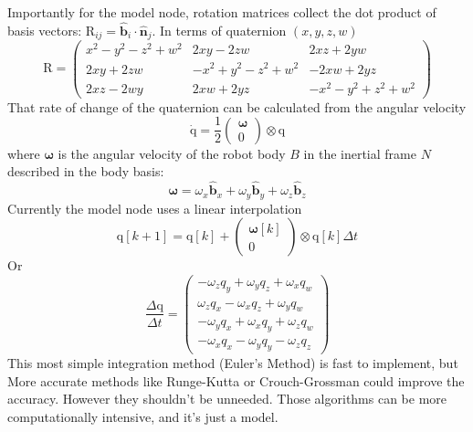 \documentclass[lettersize,journal]{IEEEtran}
\begin{document}
Importantly for the model node, rotation matrices collect the dot product of basis vectors: $\mathrm{R}_{ij} = \mathbf{\hat{b}}_i \cdot \mathbf{\hat{n}}_j$. In terms of quaternion $(x, y, z, w)$
\begin{equation}
	\mathrm{R}=\left(
	\begin{smallmatrix}
		x^2-y^2-z^2+w^2 & 2xy-2zw & 2xz+2yw \\
    2xy+2zw & -x^2+y^2-z^2+w^2 & -2xw+2yz \\
    2xz-2wy & 2xw+2yz & -x^2-y^2+z^2+w^2
	\end{smallmatrix} 
	\right) \label{EQN:RotationMatrix}
\end{equation}
That rate of change of the quaternion can be calculated from the angular velocity
\begin{equation}
	\mathrm{\dot{q}} = \frac{1}{2}
	\begin{pmatrix}
	  \boldsymbol\omega \\
		0
	\end{pmatrix}
	\otimes \mathrm{q}
\end{equation}
where $\boldsymbol\omega$ is the angular velocity of the robot body $B$ in the inertial frame $N$ described in the body basis:
\begin{equation}
	\boldsymbol\omega = \omega_x \mathbf{\hat{b}}_x + \omega_y \mathbf{\hat{b}}_y + \omega_z \mathbf{\hat{b}}_z \label{EQN:AngularVelocity}
\end{equation}
Currently the model node uses a linear interpolation
\begin{equation}
	\mathrm{q}[k+1] = \mathrm{q}[k] + 
		\begin{pmatrix}
		\boldsymbol\omega[k] \\
		0
	\end{pmatrix} \otimes
	\mathrm{q}[k] \Delta t
\end{equation}
Or 
\begin{equation}
	\frac{\Delta \mathrm{q}}{\Delta t} =
	\begin{pmatrix}
	-\omega_z q_y + \omega_y q_z + \omega_x q_w \nonumber \\
  \omega_z q_x - \omega_x q_z + \omega_y q_w \nonumber \\
  -\omega_y q_x + \omega_x q_y + \omega_z q_w \nonumber \\
  - \omega_x q_x - \omega_y q_y - \omega_z q_z
	\end{pmatrix}
\end{equation}
This most simple integration method (Euler's Method) is fast to implement, but More accurate methods like Runge-Kutta or Crouch-Grossman could improve the accuracy. However they shouldn't be unneeded. Those algorithms can be more computationally intensive, and it's just a model.
\end{document}
